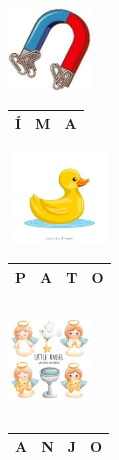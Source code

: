 \includegraphics[width=0.86458in,height=0.86667in]{media/image40.jpg}

\begin{longtable}[]{@{}lll@{}}
\toprule
Í & M & A\tabularnewline
\bottomrule
\end{longtable}

\includegraphics[width=1.07292in,height=0.97005in]{media/image41.jpg}

\begin{longtable}[]{@{}llll@{}}
\toprule
P & A & T & O\tabularnewline
\bottomrule
\end{longtable}

\includegraphics[width=0.85417in,height=1.14167in]{media/image42.jpg}

\begin{longtable}[]{@{}llll@{}}
\toprule
A & N & J & O\tabularnewline
\bottomrule
\end{longtable}




